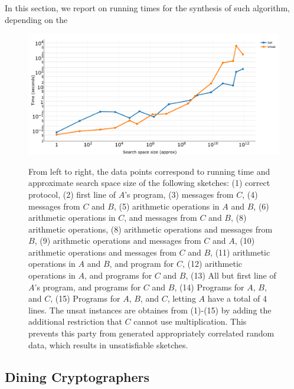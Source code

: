 \documentclass[preprint]{sig-alternate-05-2015}
\begin{document}
In this section, we report on running times
for the synthesis of such algorithm, depending on the 


\begin{figure}
\centering
\includegraphics[width=\columnwidth]{plot-sec-mult-no-labels.png}
\label{fig:plot-sec-mult}
\caption{From left to right, the data points correspond to running time and approximate search
space size of the following sketches: 
(1) correct protocol, 
(2) first line of $A$'s program,
(3) messages from $C$,
(4) messages from $C$ and $B$,
(5) arithmetic operations in $A$ and $B$,
(6) arithmetic operations in $C$, and messages from $C$ and $B$,
(8) arithmetic operations,
(8) arithmetic operations and messages from $B$,
(9) arithmetic operations and messages from $C$ and $A$,
(10) arithmetic operations and messages from $C$ and $B$,
(11) arithmetic operations in $A$ and $B$, and program for $C$,
(12) arithmetic operations in $A$, and programs for $C$ and $B$,
(13) All but first line of $A$'s program, and programs for $C$ and $B$,
(14) Programs for $A$, $B$, and $C$,
(15) Programs for $A$, $B$, and $C$, letting $A$ have a total of 4 lines.
The unsat instances are obtaines from (1)-(15) by adding the additional
restriction that $C$ cannot use multiplication. This prevents this
party from generated appropriately correlated random data,
which results in unsatisfiable sketches.
}
\end{figure}

\subsection{Dining Cryptographers}
\end{document}
